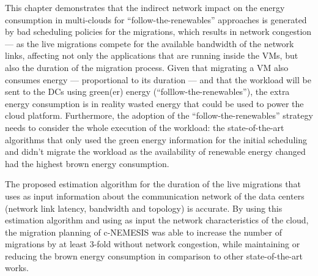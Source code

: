 This chapter demonstrates that the indirect network impact on the energy consumption in multi-clouds for ``follow-the-renewables'' approaches is generated by bad scheduling policies for the migrations, which results in network congestion --- as the live migrations compete for the available bandwidth of the network links, affecting not only the applications that are running inside the VMs, but also the duration of the migration process. Given that migrating a VM also consumes energy --- proportional to its duration --- and that the workload will be sent to the DCs using green(er) energy (``folllow-the-renewables''), the extra energy consumption is in reality wasted energy that could be used to power the cloud platform. Furthermore, the adoption of the ``follow-the-renewables'' strategy needs to consider the whole execution of the workload:  the state-of-the-art algorithms that only used the green energy information for the initial scheduling and didn't migrate the workload as the availability of renewable energy changed had the highest brown energy consumption.

The proposed estimation algorithm for the duration of the live migrations that uses as input information about the communication network of the data centers (network link latency, bandwidth and topology) is accurate. By using this estimation algorithm and using as input the network characteristics of the cloud, the migration planning of c-NEMESIS was able to increase the number of migrations by at least 3-fold without network congestion, while maintaining or reducing the brown energy consumption in comparison to other state-of-the-art works.

